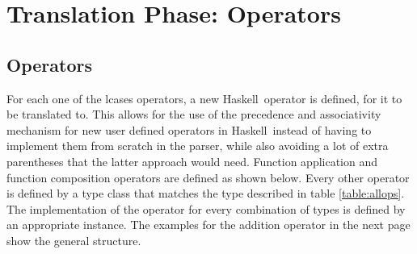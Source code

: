 \documentclass[diploma]{softlab-thesis}
\def\H{Haskell}
\begin{document}
\newpage
\section{Translation Phase: Operators}

\subsection{Operators}

For each one of the lcases operators, a new \H\ operator is defined, for it to
be translated to. This allows for the use of the precedence and associativity
mechanism for new user defined operators in \H\ instead of having to implement
them from scratch in the parser, while also avoiding a lot of extra parentheses
that the latter approach would need. Function application and function
composition operators are defined as shown below. Every other operator is
defined by a type class that matches the type described in table
\ref{table:allops}. The implementation of the operator for every combination of
types is defined by an appropriate instance. The examples for the addition
operator in the next page show the general structure.
\\
\end{document}
